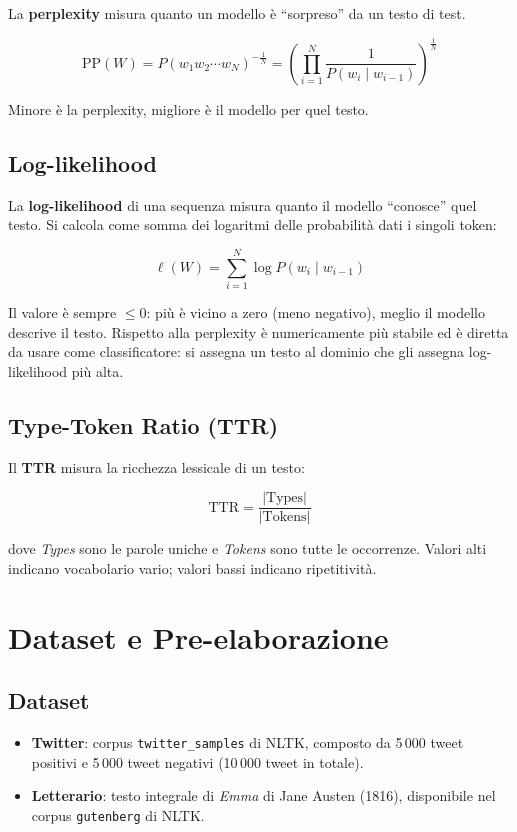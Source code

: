 ﻿\documentclass[12pt,a4paper]{article}
\begin{document}
La \textbf{perplexity} misura quanto un modello è ``sorpreso'' da un testo di test.

\[
  \text{PP}(W) = P(w_1 w_2 \cdots w_N)^{-\frac{1}{N}}
               = \left(\prod_{i=1}^{N} \frac{1}{P(w_i \mid w_{i-1})}\right)^{\frac{1}{N}}
\]

Minore è la perplexity, migliore è il modello per quel testo.

\subsection{Log-likelihood}

La \textbf{log-likelihood} di una sequenza misura quanto il modello ``conosce'' quel testo. Si calcola come somma dei logaritmi delle probabilità dati i singoli token:

\[
  \ell(W) = \sum_{i=1}^{N} \log P(w_i \mid w_{i-1})
\]

Il valore è sempre $\leq 0$: più è vicino a zero (meno negativo), meglio il modello descrive il testo. Rispetto alla perplexity è numericamente più stabile ed è diretta da usare come classificatore: si assegna un testo al dominio che gli assegna log-likelihood più alta.

\subsection{Type-Token Ratio (TTR)}

Il \textbf{TTR} misura la ricchezza lessicale di un testo:

\[
  \text{TTR} = \frac{|\text{Types}|}{|\text{Tokens}|}
\]

dove \textit{Types} sono le parole uniche e \textit{Tokens} sono tutte le occorrenze. Valori alti indicano vocabolario vario; valori bassi indicano ripetitività.

\section{Dataset e Pre-elaborazione}

\subsection{Dataset}

\begin{itemize}
  \item \textbf{Twitter}: corpus \texttt{twitter\_samples} di NLTK, composto da 5\,000 tweet positivi e 5\,000 tweet negativi (10\,000 tweet in totale).
  \item \textbf{Letterario}: testo integrale di \textit{Emma} di Jane Austen (1816), disponibile nel corpus \texttt{gutenberg} di NLTK.
\end{itemize}
\end{document}
